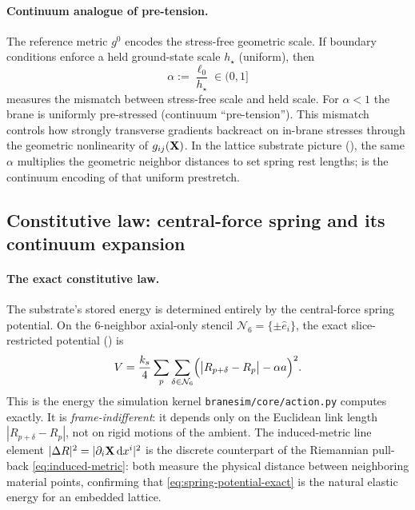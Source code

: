 \paragraph{Continuum analogue of pre-tension.}
The reference metric $g^0$ encodes the stress-free geometric scale.
If boundary conditions enforce a held ground-state scale $h_\star$ (uniform), then
\begin{equation}
  \alpha:=\frac{\ell_0}{h_\star}\in(0,1]
  \label{eq:alpha-def}
\end{equation}
measures the mismatch between stress-free scale and held scale.
For $\alpha<1$ the brane is uniformly pre-stressed (continuum ``pre-tension''). This mismatch controls how strongly
transverse gradients backreact on in-brane stresses through the geometric nonlinearity of $g_{ij}(\mathbf{X})$.
In the lattice substrate picture (), the same $\alpha$ multiplies the geometric
neighbor distances to set spring rest lengths;  is the continuum encoding of that uniform prestretch.

\subsection{Constitutive law: central-force spring and its continuum expansion}
\label{subsec:constitutive-law}

\paragraph{The exact constitutive law.}
The substrate's stored energy is determined entirely by the central-force spring potential.
On the 6-neighbor axial-only stencil $\mathcal{N}_6 = \{\pm\hat{e}_i\}$,
the exact slice-restricted potential () is
\begin{equation}
  V = \frac{k_s}{4}\sum_{p}\sum_{\delta\in\mathcal{N}_6}
        \Bigl(\bigl|R_{p+\delta} - R_p\bigr| - \alpha a\Bigr)^2.
  \label{eq:spring-potential-exact}
\end{equation}
This is the energy the simulation kernel \texttt{branesim/core/action.py} computes exactly.
It is \emph{frame-indifferent}: it depends only on the Euclidean link length $|R_{p+\delta}-R_p|$,
not on rigid motions of the ambient.
The induced-metric line element $|\Delta R|^2 = |\partial_i\mathbf{X}\,\mathrm{d} x^i|^2$ is the discrete
counterpart of the Riemannian pull-back \eqref{eq:induced-metric}: both measure the physical
distance between neighboring material points, confirming that \eqref{eq:spring-potential-exact}
is the natural elastic energy for an embedded lattice.

